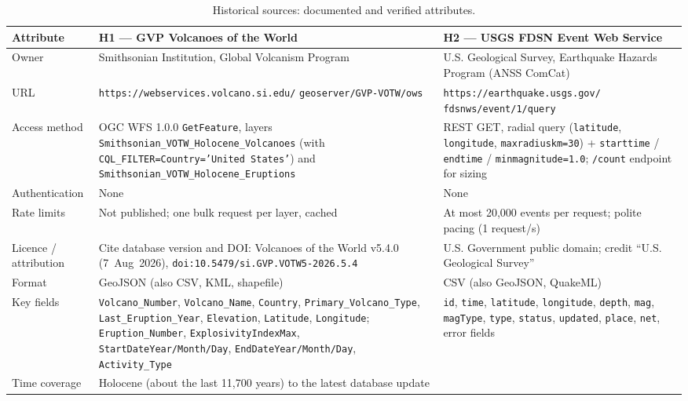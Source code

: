 \documentclass[11pt,a4paper]{article}
\begin{document}
\begin{table}[h]
\centering
\footnotesize
\setlength{\tabcolsep}{4pt}
\caption{Historical sources: documented and verified attributes.}
\label{tab:hist}
\begin{tabular}{@{}L{2.5cm}L{6.2cm}L{6.2cm}@{}}
\toprule
\textbf{Attribute} & \textbf{H1 --- GVP Volcanoes of the World} &
\textbf{H2 --- USGS FDSN Event Web Service} \\
\midrule
Owner & Smithsonian Institution, Global Volcanism Program &
U.S. Geological Survey, Earthquake Hazards Program (ANSS ComCat) \\
\addlinespace
URL & \texttt{https://webservices.volcano.si.edu/} \texttt{geoserver/GVP-VOTW/ows} &
\texttt{https://earthquake.usgs.gov/} \texttt{fdsnws/event/1/query} \\
\addlinespace
Access method & OGC WFS 1.0.0 \texttt{GetFeature}, layers
\texttt{Smithsonian\_VOTW\_Holocene\_Volcanoes} (with
\texttt{CQL\_FILTER=Country='United States'}) and
\texttt{Smithsonian\_VOTW\_Holocene\_Eruptions} &
REST GET, radial query (\texttt{latitude}, \texttt{longitude},
\texttt{maxradiuskm=30}) + \texttt{starttime} / \texttt{endtime} /
\texttt{minmagnitude=1.0}; \texttt{/count} endpoint for sizing \\
\addlinespace
Authentication & None & None \\
\addlinespace
Rate limits & Not published; one bulk request per layer, cached &
At most 20{,}000 events per request; polite pacing (1 request/s) \\
\addlinespace
Licence / attribution & Cite database version and DOI: Volcanoes of the World v5.4.0
(7~Aug~2026), \texttt{doi:10.5479/si.GVP.VOTW5-2026.5.4} &
U.S. Government public domain; credit ``U.S. Geological Survey'' \\
\addlinespace
Format & GeoJSON (also CSV, KML, shapefile) & CSV (also GeoJSON, QuakeML) \\
\addlinespace
Key fields & \texttt{Volcano\_Number}, \texttt{Volcano\_Name}, \texttt{Country},
\texttt{Primary\_Volcano\_Type}, \texttt{Last\_Eruption\_Year}, \texttt{Elevation},
\texttt{Latitude}, \texttt{Longitude}; \texttt{Eruption\_Number},
\texttt{ExplosivityIndexMax}, \texttt{StartDateYear/Month/Day},
\texttt{EndDateYear/Month/Day}, \texttt{Activity\_Type} &
\texttt{id}, \texttt{time}, \texttt{latitude}, \texttt{longitude}, \texttt{depth},
\texttt{mag}, \texttt{magType}, \texttt{type}, \texttt{status}, \texttt{updated},
\texttt{place}, \texttt{net}, error fields \\
\addlinespace
Time coverage & Holocene (about the last 11{,}700 years) to the latest database update &

\end{tabular}
\end{table}
\end{document}
